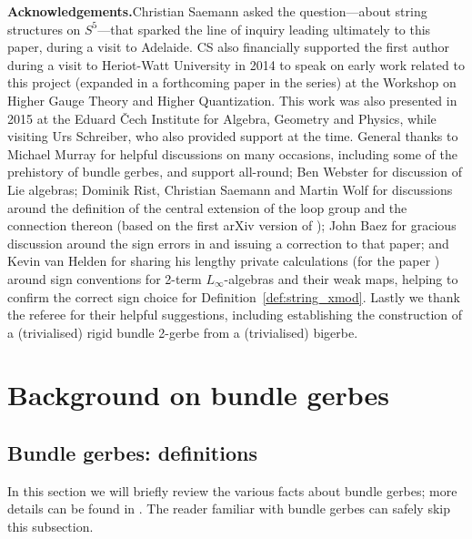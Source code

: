 \documentclass[12pt]{amsart}
\theoremstyle{plain}
\theoremstyle{definition}
\theoremstyle{remark}
\numberwithin{equation}{section}
\newcommand{\<}{\langle}
\renewcommand{\>}{\rangle}
\begin{document}
\smallskip

\noindent \textbf{Acknowledgements.}\quad  Christian Saemann asked the question---about string structures on $S^5$---that sparked the line of inquiry leading ultimately to this paper, during a visit to Adelaide. 
CS also financially supported the first author during a visit to Heriot-Watt University in 2014 to speak \cite{Roberts_14} on early work related to this project (expanded in a forthcoming paper \cite{rb2g_III} in the series) at the Workshop on Higher Gauge Theory and Higher Quantization.
This work was also presented in 2015 at the Eduard \v{C}ech Institute for Algebra, Geometry and Physics, while visiting Urs Schreiber, who also provided support at the time.
General thanks to Michael Murray for helpful discussions on many occasions, including some of the prehistory of bundle gerbes, and support all-round; Ben Webster for discussion of Lie algebras; Dominik Rist, Christian Saemann and Martin Wolf for discussions around the definition of the central extension of the loop group and the connection thereon (based on the first arXiv version of \cite{RSW_22}); John Baez for gracious discussion around the sign errors in \cite{BSCS} and issuing a correction to that paper; and Kevin van Helden for sharing his lengthy private calculations (for the paper \cite{vanHelden_21}) around sign conventions for 2-term $L_\infty$-algebras and their weak maps, helping to confirm the correct sign choice for Definition~\ref{def:string_xmod}.
Lastly we thank the referee for their helpful suggestions, including establishing the construction of a (trivialised) rigid bundle 2-gerbe from a (trivialised) bigerbe.





\section{Background on bundle gerbes}




\subsection{Bundle gerbes: definitions}

In this section we will briefly review the various facts about bundle gerbes; more details can be found in \cite{Mur,MurSte,Murray_09}. The reader familiar with bundle gerbes can safely skip this subsection.
\end{document}
